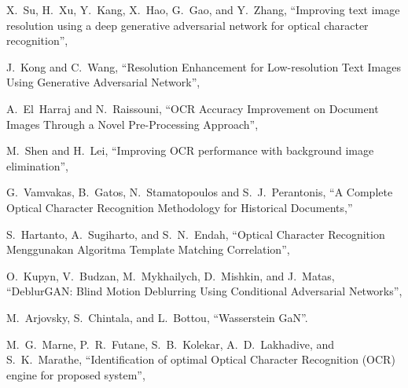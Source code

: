 \documentclass[uplatex, twocolumn,10pt]{jsarticle}
\begin{document}
\begin{thebibliography}{99}
    X.~Su, H.~Xu, Y.~Kang, X.~Hao, G.~Gao, and Y.~Zhang,
    \newblock “Improving text image resolution using a deep generative adversarial network for optical character recognition”,
    
    J.~Kong and C.~Wang,
    \newblock “Resolution Enhancement for Low-resolution Text Images Using Generative Adversarial Network”,
    
    A.~El~Harraj and N.~Raissouni,
    \newblock “OCR Accuracy Improvement on Document Images Through a Novel Pre-Processing Approach”,
    
    M.~Shen and H.~Lei,
    \newblock “Improving OCR performance with background image elimination”,
    
    G.~Vamvakas, B.~Gatos, N.~Stamatopoulos and S.~J.~Perantonis,
    \newblock “A Complete Optical Character Recognition Methodology for Historical Documents,”
    
    S.~Hartanto, A.~Sugiharto, and S.~N.~Endah,
    \newblock “Optical Character Recognition Menggunakan Algoritma Template Matching Correlation”,
    
    O.~Kupyn, V.~Budzan, M.~Mykhailych, D.~Mishkin, and J.~Matas,
    \newblock “DeblurGAN: Blind Motion Deblurring Using Conditional Adversarial Networks”,
    
    M.~Arjovsky, S.~Chintala, and L.~Bottou,
    \newblock “Wasserstein GaN”.
    
    M.~G.~Marne, P.~R.~Futane, S.~B.~Kolekar, A.~D.~Lakhadive, and S.~K.~Marathe,
    \newblock “Identification of optimal Optical Character Recognition (OCR) engine for proposed system”,
    

\end{thebibliography}
\end{document}
